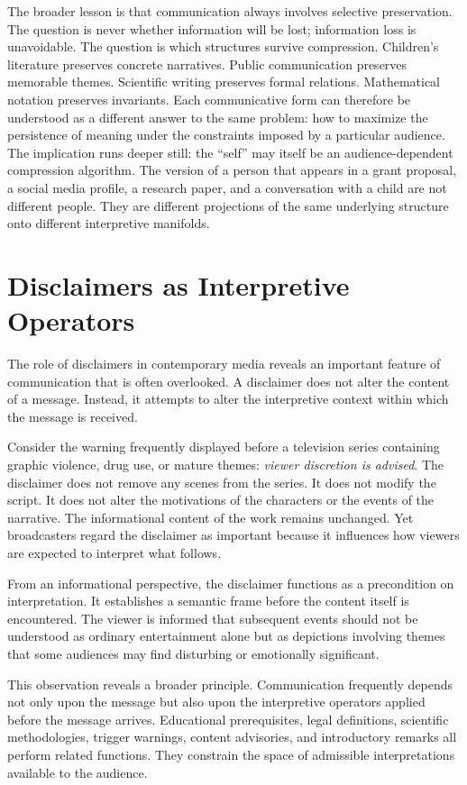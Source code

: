 \documentclass[11pt]{article}
\theoremstyle{plain}
\begin{document}
The broader lesson is that communication always involves selective preservation. The question is never whether information will be lost; information loss is unavoidable. The question is which structures survive compression. Children's literature preserves concrete narratives. Public communication preserves memorable themes. Scientific writing preserves formal relations. Mathematical notation preserves invariants. Each communicative form can therefore be understood as a different answer to the same problem: how to maximize the persistence of meaning under the constraints imposed by a particular audience. The implication runs deeper still: the ``self'' may itself be an audience-dependent compression algorithm. The version of a person that appears in a grant proposal, a social media profile, a research paper, and a conversation with a child are not different people. They are different projections of the same underlying structure onto different interpretive manifolds.

\section{Disclaimers as Interpretive Operators}

The role of disclaimers in contemporary media reveals an important feature of communication that is often overlooked. A disclaimer does not alter the content of a message. Instead, it attempts to alter the interpretive context within which the message is received.

Consider the warning frequently displayed before a television series containing graphic violence, drug use, or mature themes: \emph{viewer discretion is advised}. The disclaimer does not remove any scenes from the series. It does not modify the script. It does not alter the motivations of the characters or the events of the narrative. The informational content of the work remains unchanged. Yet broadcasters regard the disclaimer as important because it influences how viewers are expected to interpret what follows.

From an informational perspective, the disclaimer functions as a precondition on interpretation. It establishes a semantic frame before the content itself is encountered. The viewer is informed that subsequent events should not be understood as ordinary entertainment alone but as depictions involving themes that some audiences may find disturbing or emotionally significant.

This observation reveals a broader principle. Communication frequently depends not only upon the message but also upon the interpretive operators applied before the message arrives. Educational prerequisites, legal definitions, scientific methodologies, trigger warnings, content advisories, and introductory remarks all perform related functions. They constrain the space of admissible interpretations available to the audience.
\end{document}
